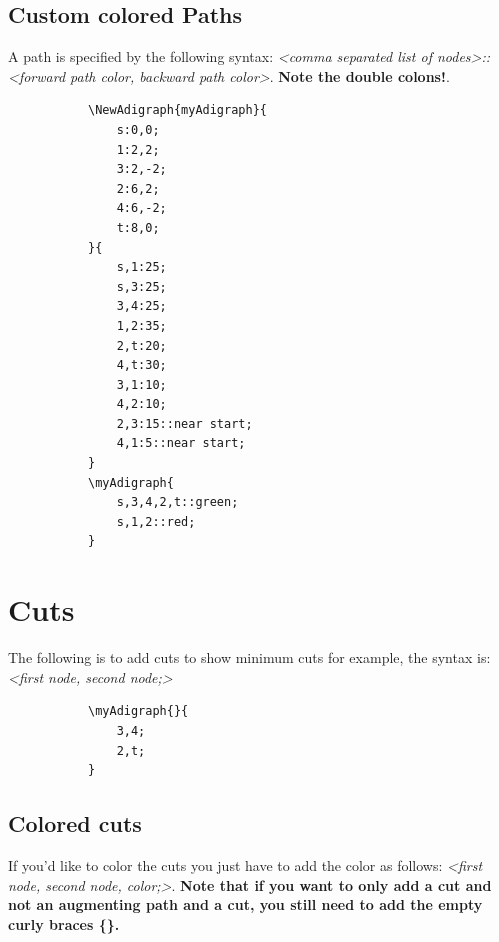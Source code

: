 \documentclass{report}
\begin{document}
\subsection{Custom colored Paths}
A path is specified by the following syntax: \textit{<comma separated list of nodes>::<forward path color, backward path color>}. \textbf{Note the double colons!}.


\begin{figure}
	\begin{subfigure}{0.49\textwidth}
		\begin{verbatim}
\NewAdigraph{myAdigraph}{
	s:0,0;
	1:2,2;
	3:2,-2;
	2:6,2;
	4:6,-2;
	t:8,0;
}{
	s,1:25;
	s,3:25;
	3,4:25;
	1,2:35;
	2,t:20;
	4,t:30;
	3,1:10;
	4,2:10;
	2,3:15::near start;
	4,1:5::near start;
}
\myAdigraph{
	s,3,4,2,t::green;
	s,1,2::red;
}
\end{verbatim}
	\end{subfigure}
	\begin{subfigure}{0.49\textwidth}
	\end{subfigure}
\end{figure}

\section{Cuts}
The following is to add cuts to show minimum cuts for example, the syntax is: \textit{<first node, second node;>}

\begin{figure}
	\begin{subfigure}{0.49\textwidth}
		\begin{verbatim}
\myAdigraph{}{
	3,4;
	2,t;
}
\end{verbatim}
	\end{subfigure}
	\begin{subfigure}{0.49\textwidth}
	\end{subfigure}
\end{figure}

\subsection{Colored cuts}
If you'd like to color the cuts you just have to add the color as follows: \textit{<first node, second node, color;>}. \textbf{Note that if you want to only add a cut and not an augmenting path and a cut, you still need to add the empty curly braces \{\}.}
\end{document}

